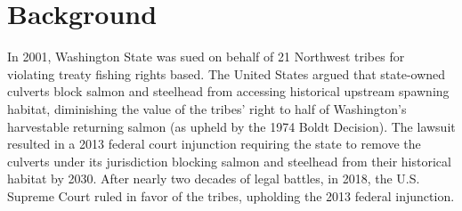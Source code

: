 \documentclass[12pt]{elsarticle}
\begin{document}


\section{Background} %

In 2001, Washington State was sued on behalf of 21 Northwest tribes for violating treaty fishing rights based. The United States argued that state-owned culverts block salmon and steelhead from accessing historical upstream spawning habitat, diminishing the value of the tribes' right to half of Washington's harvestable returning salmon (as upheld by the 1974 Boldt Decision). The lawsuit resulted in a 2013 federal court injunction requiring the state to remove the culverts under its jurisdiction blocking salmon and steelhead from their historical habitat by 2030. After nearly two decades of legal battles, in 2018, the U.S. Supreme Court ruled in favor of the tribes, upholding the 2013 federal injunction. 
\end{document}
